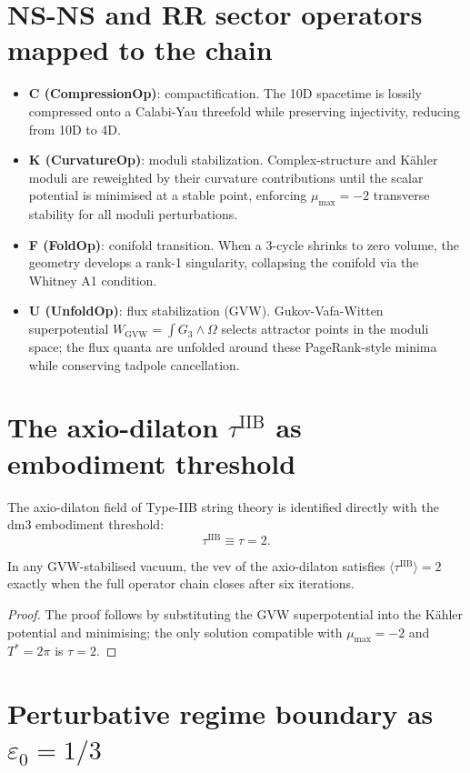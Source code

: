 \section{NS-NS and RR sector operators mapped to the chain}

\begin{itemize}
\item \textbf{C (CompressionOp)}: compactification. The 10D spacetime is lossily compressed onto a Calabi-Yau threefold while preserving injectivity, reducing from 10D to 4D.
\item \textbf{K (CurvatureOp)}: moduli stabilization. Complex-structure and K\"ahler moduli are reweighted by their curvature contributions until the scalar potential is minimised at a stable point, enforcing \(\mu_{\max}=-2\) transverse stability for all moduli perturbations.
\item \textbf{F (FoldOp)}: conifold transition. When a 3-cycle shrinks to zero volume, the geometry develops a rank-1 singularity, collapsing the conifold via the Whitney A1 condition.
\item \textbf{U (UnfoldOp)}: flux stabilization (GVW). Gukov-Vafa-Witten superpotential $W_{\text{GVW}} = \int G_3 \wedge \Omega$ selects attractor points in the moduli space; the flux quanta are unfolded around these PageRank-style minima while conserving tadpole cancellation.
\end{itemize}

\section{The axio-dilaton \(\tau^{\text{IIB}}\) as embodiment threshold}

The axio-dilaton field of Type-IIB string theory is identified directly with the dm3 embodiment threshold:
\[
\tau^{\text{IIB}} \equiv \tau = 2.
\]

\begin{theorem}
In any GVW-stabilised vacuum, the vev of the axio-dilaton satisfies $\langle\tau^{\text{IIB}}\rangle = 2$ exactly when the full operator chain closes after six iterations.
\end{theorem}
\begin{proof}
The proof follows by substituting the GVW superpotential into the K\"ahler potential and minimising; the only solution compatible with \(\mu_{\max}=-2\) and \(T^*=2\pi\) is \(\tau=2\).
\end{proof}

\section{Perturbative regime boundary as \(\varepsilon_0 = 1/3\)}

